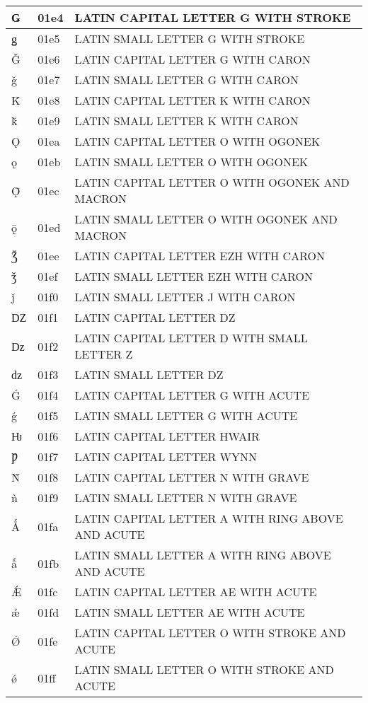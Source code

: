 \documentclass[12pt,letterpaper,openany]{book}
\begin{document}
\begin{center}
\begin{supertabular}{|m{0.25in}|m{0.5in}|m{4in}|}
Ǥ & 01e4 & LATIN CAPITAL LETTER G WITH STROKE\\\hline
ǥ & 01e5 & LATIN SMALL LETTER G WITH STROKE\\\hline
Ǧ & 01e6 & LATIN CAPITAL LETTER G WITH CARON\\\hline
ǧ & 01e7 & LATIN SMALL LETTER G WITH CARON\\\hline
Ǩ & 01e8 & LATIN CAPITAL LETTER K WITH CARON\\\hline
ǩ & 01e9 & LATIN SMALL LETTER K WITH CARON\\\hline
Ǫ & 01ea & LATIN CAPITAL LETTER O WITH OGONEK\\\hline
ǫ & 01eb & LATIN SMALL LETTER O WITH OGONEK\\\hline
Ǭ & 01ec & LATIN CAPITAL LETTER O WITH OGONEK AND MACRON\\\hline
ǭ & 01ed & LATIN SMALL LETTER O WITH OGONEK AND MACRON\\\hline
Ǯ & 01ee & LATIN CAPITAL LETTER EZH WITH CARON\\\hline
ǯ & 01ef & LATIN SMALL LETTER EZH WITH CARON\\\hline
ǰ & 01f0 & LATIN SMALL LETTER J WITH CARON\\\hline
Ǳ & 01f1 & LATIN CAPITAL LETTER DZ\\\hline
ǲ & 01f2 & LATIN CAPITAL LETTER D WITH SMALL LETTER Z\\\hline
ǳ & 01f3 & LATIN SMALL LETTER DZ\\\hline
Ǵ & 01f4 & LATIN CAPITAL LETTER G WITH ACUTE\\\hline
ǵ & 01f5 & LATIN SMALL LETTER G WITH ACUTE\\\hline
Ƕ & 01f6 & LATIN CAPITAL LETTER HWAIR\\\hline
Ƿ & 01f7 & LATIN CAPITAL LETTER WYNN\\\hline
Ǹ & 01f8 & LATIN CAPITAL LETTER N WITH GRAVE\\\hline
ǹ & 01f9 & LATIN SMALL LETTER N WITH GRAVE\\\hline
Ǻ & 01fa & LATIN CAPITAL LETTER A WITH RING ABOVE AND ACUTE\\\hline
ǻ & 01fb & LATIN SMALL LETTER A WITH RING ABOVE AND ACUTE\\\hline
Ǽ & 01fc & LATIN CAPITAL LETTER AE WITH ACUTE\\\hline
ǽ & 01fd & LATIN SMALL LETTER AE WITH ACUTE\\\hline
Ǿ & 01fe & LATIN CAPITAL LETTER O WITH STROKE AND ACUTE\\\hline
ǿ & 01ff & LATIN SMALL LETTER O WITH STROKE AND ACUTE\\\hline

\end{supertabular}
\end{center}
\end{document}

